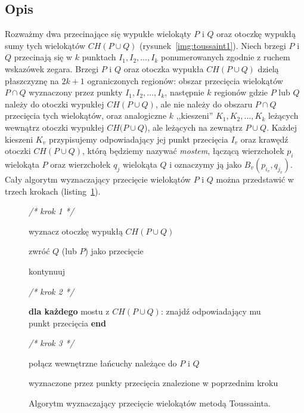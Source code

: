 \subsection{Opis}
Rozważmy dwa przecinające się wypukłe wielokąty $P$ i $Q$ oraz otoczkę
wypukłą sumy tych wielokątów $CH(P \cup Q)$
(rysunek~\ref{img:toussaint1}). Niech brzegi $P$ i $Q$ przecinają się
w $k$ punktach $I_1, I_2, \ldots, I_k$ ponumerowanych zgodnie z ruchem
wskazówek zegara. Brzegi $P$ i $Q$ oraz otoczka wypukła $CH(P \cup Q)$
dzielą płaszczyznę na $2k + 1$ ograniczonych regionów: obszar
przecięcia wielokątów $P \cap Q$ wyznaczony przez punkty $I_1, I_2,
\ldots, I_k$, następnie $k$ regionów gdzie $P$ lub $Q$ należy do
otoczki wypukłej $CH(P \cup Q)$, ale nie należy do obszaru $P \cap Q$
przecięcia tych wielokątów, oraz analogiczne $k$ ,,kieszeni'' $K_1,
K_2, \ldots, K_k$ leżących wewnątrz otoczki wypukłej $CH(P \cup Q$),
ale leżących na zewnątrz $P \cup Q$. Każdej kieszeni $K_v$
przypisujemy odpowiadający jej punkt przecięcia $I_v$ oraz krawędź
otoczki $CH(P \cup Q)$, którą będziemy nazywać \emph{mostem}, łączącą
wierzchołek $p_i$ wielokąta $P$ oraz wierzchołek $q_j$ wielokąta $Q$ i
oznaczymy ją jako $B_{v}(p_{i_v}, q_{j_v})$. Cały algorytm
wyznaczający przecięcie wielokątów $P$ i $Q$ można przedstawić w
trzech krokach (listing~\ref{alg:interconpol}).

\begin{figure}[htp]
  \begin{algorithmic}[1]

    \State \emph{/* krok 1 */}

    \State wyznacz otoczkę wypukłą $CH(P \cup Q)$

    \State

    \State zwróć $Q$ (lub $P$) jako przecięcie

    \Else
    \State kontynuuj
    \EndIf

    \State

    \State \emph{/* krok 2 */}

    \State \textbf{dla każdego} mostu z $CH(P \cup Q)$:
    \State \hspace{\algorithmicindent} znajdź odpowiadający mu punkt
    przecięcia
    \State \textbf{end}

    \State

    \State \emph{/* krok 3 */}

    \State połącz wewnętrzne łańcuchy należące do $P$ i $Q$

    wyznaczone przez punkty przecięcia znalezione w poprzednim kroku

    \EndProcedure
  \end{algorithmic}
  \caption{\label{alg:interconpol} Algorytm wyznaczający przecięcie
    wielokątów metodą Toussainta.}
\end{figure}


